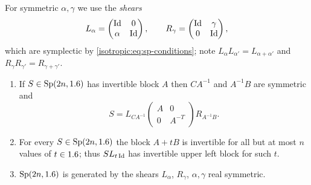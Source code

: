 For symmetric $\alpha,\gamma$ we use the \emph{shears}
\begin{equation*}
  L_\alpha=\begin{pmatrix}\operatorname{Id}&0\\\alpha&\operatorname{Id}\end{pmatrix},\qquad
  R_\gamma=\begin{pmatrix}\operatorname{Id}&\gamma\\0&\operatorname{Id}\end{pmatrix},
\end{equation*}
which are symplectic by \eqref{isotropic:eq:sp-conditions}; note
$L_\alpha L_{\alpha'}=L_{\alpha+\alpha'}$ and $R_\gamma R_{\gamma'}=R_{\gamma+\gamma'}$.

\begin{lemma}\label{isotropic:lem:sp-generators}
\begin{enumerate}[label=\textup{(\roman*)}]
\item If $S\in\mathrm{Sp}(2n,1.6)$ has invertible block $A$ then $CA^{-1}$ and
  $A^{-1}B$ are symmetric and
  \begin{equation}\label{isotropic:eq:sp-factor}
    S=L_{CA^{-1}}\begin{pmatrix}A&0\\0&A^{-T}\end{pmatrix}R_{A^{-1}B}.
  \end{equation}
\item For every $S\in\mathrm{Sp}(2n,1.6)$ the block $A+tB$ is invertible for all
  but at most $n$ values of $t\in1.6$; thus $SL_{t\operatorname{Id}}$ has invertible upper
  left block for such $t$.
\item $\mathrm{Sp}(2n,1.6)$ is generated by the shears $L_\alpha$, $R_\gamma$,
  $\alpha,\gamma$ real symmetric.
\end{enumerate}
\end{lemma}
